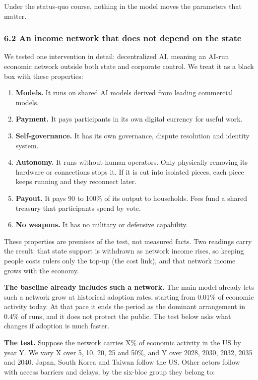 \documentclass[
  10pt,
]{article}
\providecommand{\tightlist}{%
  \setlength{\itemsep}{0pt}\setlength{\parskip}{0pt}}
\begin{document}
Under the status-quo course, nothing in the model moves the parameters that matter.

\subsubsection{6.2 An income network that does not depend on the
state}\label{an-income-network-that-does-not-depend-on-the-state}

We tested one intervention in detail: decentralized AI, meaning an AI-run economic network outside
both state and corporate control. We treat it as a black box with these properties:

\begin{enumerate}
\def\labelenumi{\arabic{enumi}.}
\tightlist
\item
  \textbf{Models.} It runs on shared AI models derived from leading commercial models.
\item
  \textbf{Payment.} It pays participants in its own digital currency for useful work.
\item
  \textbf{Self-governance.} It has its own governance, dispute resolution and identity system.
\item
  \textbf{Autonomy.} It runs without human operators. Only physically removing its hardware or
  connections stops it. If it is cut into isolated pieces, each piece keeps running and they
  reconnect later.
\item
  \textbf{Payout.} It pays 90 to 100\% of its output to households. Fees fund a shared treasury that
  participants spend by vote.
\item
  \textbf{No weapons.} It has no military or defensive capability.
\end{enumerate}

These properties are premises of the test, not measured facts. Two readings carry the result: that
state support is withdrawn as network income rises, so keeping people costs rulers only the top-up
(the cost link), and that network income grows with the economy.

\textbf{The baseline already includes such a network.} The main model already lets such a network
grow at historical adoption rates, starting from 0.01\% of economic activity today. At that pace it
ends the period as the dominant arrangement in 0.4\% of runs, and it does not protect the public.
The test below asks what changes if adoption is much faster.

\textbf{The test.} Suppose the network carries X\% of economic activity in the US by year Y. We vary
X over 5, 10, 20, 25 and 50\%, and Y over 2028, 2030, 2032, 2035 and 2040. Japan, South Korea and
Taiwan follow the US. Other actors follow with access barriers and delays, by the six-bloc group
they belong to:
\end{document}
